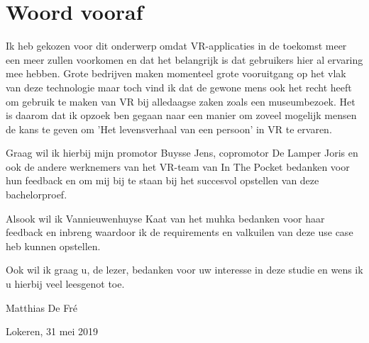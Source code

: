 
\chapter*{Woord vooraf}
\label{ch:voorwoord}

Ik heb gekozen voor dit onderwerp omdat VR-applicaties in de toekomst meer een meer zullen voorkomen en dat het belangrijk is dat gebruikers hier al ervaring mee hebben. Grote bedrijven maken momenteel grote vooruitgang op het vlak van deze technologie maar toch vind ik dat de gewone mens ook het recht heeft om gebruik te maken van VR bij alledaagse zaken zoals een museumbezoek. Het is daarom dat ik opzoek ben gegaan naar een manier om zoveel mogelijk mensen de kans te geven om 'Het levensverhaal van een persoon' in VR te ervaren.

Graag wil ik hierbij mijn promotor Buysse Jens, copromotor De Lamper Joris en ook de andere werknemers van het VR-team van In The Pocket bedanken voor hun feedback en om mij bij te staan bij het succesvol opstellen van deze bachelorproef.

Alsook wil ik Vannieuwenhuyse Kaat van het \acrfull{muhka} bedanken voor haar feedback en inbreng waardoor ik de requirements en valkuilen van deze use case heb kunnen opstellen.

Ook wil ik graag u, de lezer, bedanken voor uw interesse in deze studie en wens ik u hierbij veel leesgenot toe.

Matthias De Fré

Lokeren, 31 mei 2019